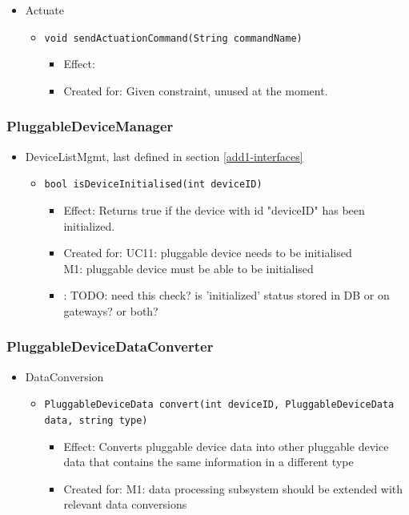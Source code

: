 \begin{itemize}
        	\item Actuate
        	\begin{itemize}
                \item \texttt{void sendActuationCommand(String commandName)}
                    \begin{itemize}
                        \item Effect:
                        \item Created for: Given constraint, unused at the moment.
                    \end{itemize}
        	\end{itemize}
        \end{itemize}

    \subsubsection{PluggableDeviceManager}
        \begin{itemize}
        	\item DeviceListMgmt, last defined in section \ref{add1-interfaces}
        	\begin{itemize}
        		\item \texttt{bool isDeviceInitialised(int deviceID)}
        		\begin{itemize}
        			\item Effect: Returns true if the device with id "deviceID" has been initialized.
                    \item Created for: UC11: pluggable device needs to be initialised \\
                          M1: pluggable device must be able to be initialised
                    \item: TODO: need this check? is 'initialized' status stored in DB or on gateways? or both?
        		\end{itemize}
        	\end{itemize}
        \end{itemize}


    \subsubsection{PluggableDeviceDataConverter}
    \begin{itemize}
        \item DataConversion
        \begin{itemize}
            \item \texttt{PluggableDeviceData convert(int deviceID, PluggableDeviceData data, string type)}
            \begin{itemize}
                \item Effect: Converts pluggable device data into other pluggable device
                      data that contains the same information in a different type
                \item Created for: M1: data processing subsystem should be
                      extended with relevant data conversions
            \end{itemize}
        \end{itemize}
    \end{itemize}

